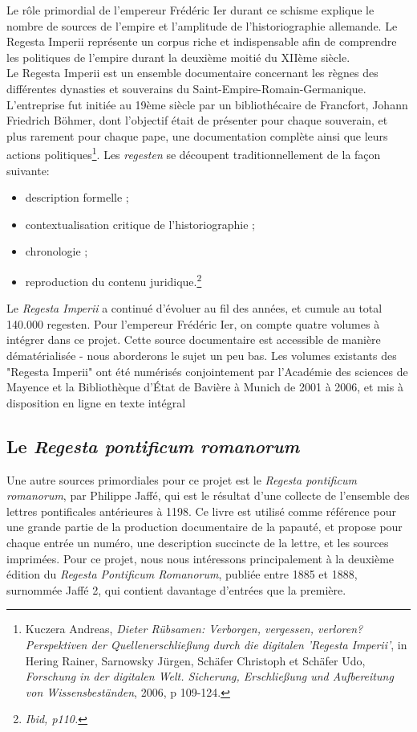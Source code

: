 Le rôle primordial de l’empereur Frédéric Ier durant ce schisme explique le nombre de sources de l’empire et l’amplitude de l’historiographie allemande. Le Regesta Imperii représente un corpus riche et indispensable afin de comprendre les politiques de l’empire durant la deuxième moitié du XIIème siècle.\\
Le Regesta Imperii est un ensemble documentaire concernant les règnes des différentes dynasties et souverains du Saint-Empire-Romain-Germanique. L’entreprise fut initiée au 19ème siècle par un bibliothécaire de Francfort, Johann Friedrich Böhmer, dont l’objectif était de présenter pour chaque souverain, et plus rarement pour chaque pape, une documentation complète ainsi que leurs actions politiques\footnote{Kuczera Andreas, \textit{Dieter Rübsamen: Verborgen, vergessen, verloren? Perspektiven der Quellenerschließung durch die digitalen 'Regesta Imperii'}, in Hering Rainer, Sarnowsky Jürgen, Schäfer Christoph et Schäfer Udo, \textit{Forschung in der digitalen Welt. Sicherung, Erschließung und Aufbereitung von Wissensbeständen}, 2006, p 109-124.}. Les \textit{regesten} se découpent traditionnellement de la façon suivante:
\begin{itemize}
    \item description formelle ;
    \item contextualisation critique de l’historiographie ;
    \item chronologie ;
    \item reproduction du contenu juridique.\footnote{\textit{Ibid, p110.}}
    
\end{itemize}
Le \textit{Regesta Imperii} a continué d’évoluer au fil des années, et cumule au total 140.000 regesten. Pour l’empereur Frédéric Ier, on compte quatre volumes à intégrer dans ce projet. Cette source documentaire est accessible de manière dématérialisée - nous aborderons le sujet un peu bas. Les volumes existants des "Regesta Imperii" ont été numérisés conjointement par l'Académie des sciences de Mayence et la Bibliothèque d'État de Bavière à Munich de 2001 à 2006, et mis à disposition en ligne en texte intégral



    \subsection{Le \textit{Regesta pontificum romanorum}}

Une autre sources primordiales pour ce projet est le \textit{Regesta pontificum romanorum}, par Philippe Jaffé, qui est le résultat d’une collecte de l’ensemble des lettres pontificales antérieures à 1198. Ce livre est utilisé comme référence pour une grande partie de la production documentaire de la papauté, et propose pour chaque entrée un numéro, une description succincte de la lettre, et les sources imprimées. Pour ce projet, nous nous intéressons principalement à la deuxième édition du \textit{Regesta Pontificum Romanorum}, publiée entre 1885 et 1888, surnommée Jaffé 2, qui contient davantage d’entrées que la première.\\

